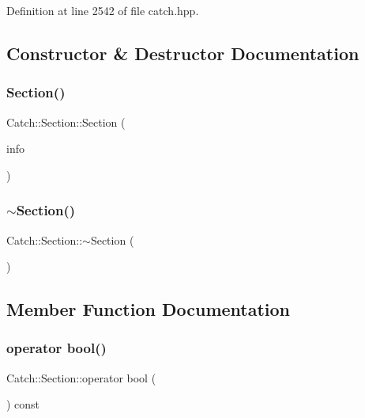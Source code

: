 Definition at line 2542 of file catch.\+hpp.



\subsection{Constructor \& Destructor Documentation}
\mbox{\label{class_catch_1_1_section_a68fd4e51e8981aaa7ddb00d8a6abd099}} 
\subsubsection{Section()}
{\footnotesize\ttfamily Catch\+::\+Section\+::\+Section (\begin{DoxyParamCaption}\item[{\textbf{ Section\+Info} const \&}]{info }\end{DoxyParamCaption})}

\mbox{\label{class_catch_1_1_section_aa1422edd68a77aa578b5cc6b8b69f86f}} 
\subsubsection{$\sim$Section()}
{\footnotesize\ttfamily Catch\+::\+Section\+::$\sim$\+Section (\begin{DoxyParamCaption}{ }\end{DoxyParamCaption})}



\subsection{Member Function Documentation}
\mbox{\label{class_catch_1_1_section_a0632b804dcea1417a2970620a9742eb3}} 
\subsubsection{operator bool()}
{\footnotesize\ttfamily Catch\+::\+Section\+::operator bool (\begin{DoxyParamCaption}{ }\end{DoxyParamCaption}) const\hspace{0.3cm}{\ttfamily [explicit]}}




